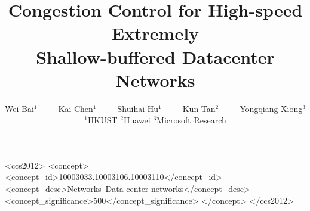\documentclass[10pt, sigconf]{acmart}
\begin{document}

\title{Congestion Control for High-speed Extremely\\Shallow-buffered Datacenter Networks}

\author{Wei Bai$^{1}$~~~~~Kai Chen$^1$~~~~~Shuihai Hu$^1$~~~~~Kun Tan$^2$~~~~~Yongqiang Xiong$^3$ \\
$^1$HKUST $^2$Huawei $^3$Microsoft Research}


\renewcommand{\shortauthors}{W. Bai et al.}
\renewcommand{\textrightarrow}{$\rightarrow$}

\begin{abstract}

\end{abstract}

\begin{CCSXML}
<ccs2012>
<concept>
<concept_id>10003033.10003106.10003110</concept_id>
<concept_desc>Networks~Data center networks</concept_desc>
<concept_significance>500</concept_significance>
</concept>
</ccs2012>
\end{CCSXML}



\maketitle













\end{document}
